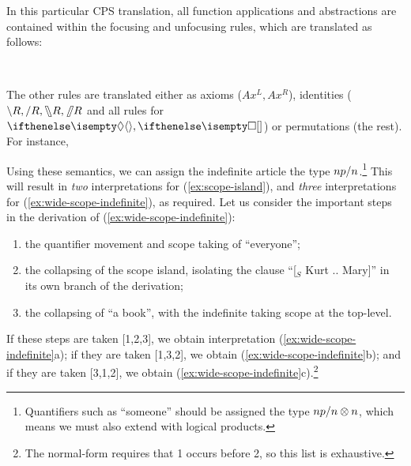 \documentclass[10pt,a4paper]{llncs}
\begin{document}
In this particular CPS translation, all function applications and
abstractions are contained within the focusing and unfocusing rules,
which are translated as follows:
\begin{center}
  \begin{scprooftree*}
  \end{scprooftree*}
  \begin{scprooftree*}
  \end{scprooftree*}
  \\[1\baselineskip]
  \begin{scprooftree*}
  \end{scprooftree*}
  \begin{scprooftree*}
  \end{scprooftree*}
\end{center}
The other rules are translated either as axioms ($Ax^L,Ax^R$),
identities ($\impr R,\impl R,\himpr R,\himpl R$ and all rules for
$\di,\sq$) or permutations (the rest). For instance,
\begin{scprooftree}
\end{scprooftree}
Using these semantics, we can assign the indefinite article the type
$np \impl n$.\footnote{%
  Quantifiers such as ``someone'' should be assigned the type $np\impl
  n\otimes n$, which means we must also extend \NLCL with logical
  products.
}
This will result in \emph{two} interpretations for
(\ref{ex:scope-island}), and \emph{three} interpretations for
(\ref{ex:wide-scope-indefinite}), as required. Let us consider the
important steps in the derivation of (\ref{ex:wide-scope-indefinite}):
\begin{enumerate}
\item the quantifier movement and scope taking of ``everyone'';
\item the collapsing of the scope island, isolating the clause
  ``[$_S$ Kurt .. Mary]'' in its own branch of the derivation;
\item the collapsing of ``a book'', with the indefinite taking scope
  at the top-level.
\end{enumerate}
If these steps are taken [1,2,3], we obtain interpretation
(\ref{ex:wide-scope-indefinite}a); if they are taken [1,3,2], we
obtain (\ref{ex:wide-scope-indefinite}b); and if they are taken
[3,1,2], we obtain (\ref{ex:wide-scope-indefinite}c).\footnote{%
  The normal-form requires that 1 occurs before 2, so this list is
  exhaustive.
}
\end{document}
